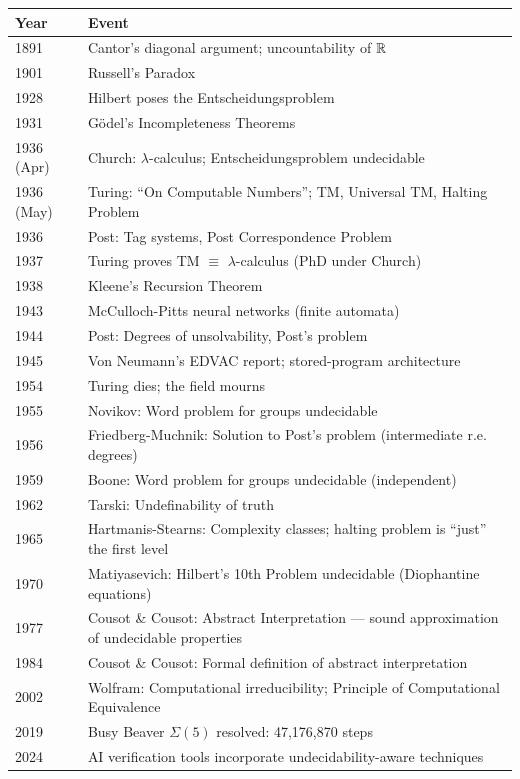 \begin{tabularx}{\linewidth}{|l|X|}
\hline
\textbf{Year} & \textbf{Event} \\ \hline
1891 & Cantor's diagonal argument; uncountability of $\mathbb{R}$ \\ \hline
1901 & Russell's Paradox \\ \hline
1928 & Hilbert poses the Entscheidungsproblem \\ \hline
1931 & G\"odel's Incompleteness Theorems \\ \hline
1936 (Apr) & Church: $\lambda$-calculus; Entscheidungsproblem undecidable \\ \hline
1936 (May) & Turing: ``On Computable Numbers''; TM, Universal TM, Halting Problem \\ \hline
1936 & Post: Tag systems, Post Correspondence Problem \\ \hline
1937 & Turing proves TM $\equiv$ $\lambda$-calculus (PhD under Church) \\ \hline
1938 & Kleene's Recursion Theorem \\ \hline
1943 & McCulloch-Pitts neural networks (finite automata) \\ \hline
1944 & Post: Degrees of unsolvability, Post's problem \\ \hline
1945 & Von Neumann's EDVAC report; stored-program architecture \\ \hline
1954 & Turing dies; the field mourns \\ \hline
1955 & Novikov: Word problem for groups undecidable \\ \hline
1956 & Friedberg-Muchnik: Solution to Post's problem (intermediate r.e. degrees) \\ \hline
1959 & Boone: Word problem for groups undecidable (independent) \\ \hline
1962 & Tarski: Undefinability of truth \\ \hline
1965 & Hartmanis-Stearns: Complexity classes; halting problem is ``just'' the first level \\ \hline
1970 & Matiyasevich: Hilbert's 10th Problem undecidable (Diophantine equations) \\ \hline
1977 & Cousot \& Cousot: Abstract Interpretation — sound approximation of undecidable properties \\ \hline
1984 & Cousot \& Cousot: Formal definition of abstract interpretation \\ \hline
2002 & Wolfram: Computational irreducibility; Principle of Computational Equivalence \\ \hline
2019 & Busy Beaver $\Sigma(5)$ resolved: 47,176,870 steps \\ \hline
2024 & AI verification tools incorporate undecidability-aware techniques \\ \hline
\end{tabularx}


